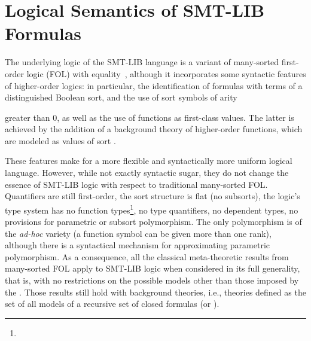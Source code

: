 



\chapter{Logical Semantics of SMT-LIB Formulas} \label{chap:logical-semantics}
\thispagestyle{empty}

The underlying logic of the SMT-LIB language is a variant of many-sorted 
first-order logic (FOL) with equality~\cite{Man-MSL-93,Gal-86,Hen-01},
although it incorporates some syntactic  features 
of higher-order logics:
in particular, the identification of formulas with terms 
of a distinguished Boolean sort, and the use of sort symbols of arity 
\begin{newver}
greater than 0,
as well as the use of functions as first-class values.
The latter is achieved by the addition of a background theory 
of higher-order functions,
which are modeled as values of sort .
\end{newver}


These features make for a more flexible and syntactically more uniform 
logical language.
However, while not exactly syntactic sugar, they do not change the essence 
of SMT-LIB logic with respect to traditional many-sorted FOL.
Quantifiers are still first-order, the sort structure is flat (no subsorts),
the logic's type system has no function types\footnote{}, 
no type quantifiers, no dependent types,
no provisions for parametric or subsort polymorphism.
The only polymorphism is of the \emph{ad-hoc} variety (a function symbol 
can be given more than one rank), although there is a syntactical mechanism 
for approximating parametric polymorphism.
As a consequence, all the classical meta-theoretic results from many-sorted 
FOL apply to SMT-LIB logic when considered in its full generality, that is,
with no restrictions on the possible models other than those imposed 
by the  .
Those results still hold with  
background theories, i.e., theories defined as the set of all models
of a recursive set of closed formulas (or ).
\medskip

